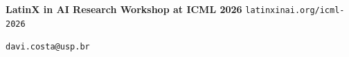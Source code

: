 \documentclass[final]{article}
\begin{document}
\vspace{0.075in}

\colorbox{ciaamDark}{%
\begin{minipage}{\dimexpr\linewidth-2\fboxsep\relax}
  \color{white}
  \begin{minipage}[c]{0.24\linewidth}
    \mbox{}
  \end{minipage}\hfill
  \begin{minipage}[c]{0.48\linewidth}
    \centering
    {\fontsize{15.5}{18}\selectfont\bfseries LatinX in AI Research Workshop at ICML 2026}\quad
    {\fontsize{10.5}{12}\selectfont \texttt{latinxinai.org/icml-2026}}
  \end{minipage}\hfill
  \begin{minipage}[c]{0.24\linewidth}
    \raggedleft
    {\fontsize{11}{13}\selectfont \texttt{davi.costa@usp.br}}
  \end{minipage}
\end{minipage}}
\end{document}
